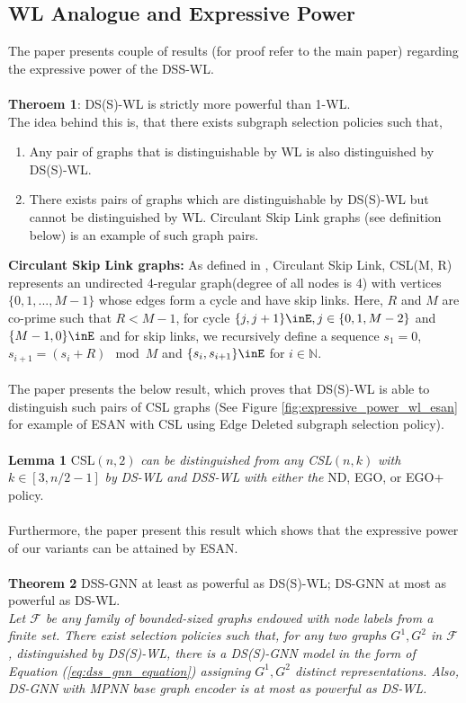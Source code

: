 \documentclass[11pt, dvipsnames, DIV=12]{scrreprt}
\theoremstyle{definition}
\begin{document}
\subsection{WL Analogue and Expressive Power}
The paper presents couple of results (for proof refer to the main paper) regarding the expressive power of the DSS-WL.\\\\
\textbf{Theroem 1}: DS(S)-WL is strictly more powerful than 1-WL. \\
The idea behind this is, that there exists subgraph selection policies such that,
\begin{enumerate}
    \item Any pair of graphs that is distinguishable by WL is also distinguished by DS(S)-WL.
    \item There exists pairs of graphs which are distinguishable by DS(S)-WL but cannot be distinguished by WL. Circulant Skip Link graphs (see definition below) is an example of such graph pairs.
\end{enumerate}\textbf{Circulant Skip Link graphs:} As defined in \cite{murphy_rel_pooling_2019}, Circulant Skip Link, CSL(M, R) represents an undirected 4-regular graph(degree of all nodes is 4) with vertices $\{0, 1, . . . , M − 1\}$ whose edges form a cycle and have skip links. Here, $R$ and $M$ are co-prime such that $R<M-1$, for cycle $\{j,j+1\}\inE, j\in\{0,1,M-2\}$ and $\{M-1,0\}\inE$ and for skip links, we recursively define a sequence $s_1=0$, $s_{i+1}=(s_i+R)\mod M$ and $\{s_i,s_{i+1}\}\inE$ for $i\in\mathbb{N}$.
\\\\The paper presents the below result, which proves that DS(S)-WL is able to distinguish such pairs of CSL graphs (See Figure \ref{fig:expressive_power_wl_esan} for example of ESAN with CSL using Edge Deleted subgraph selection policy).\\\\
\textbf{Lemma 1} CSL$(n, 2)$ \textit{can be distinguished from any CSL}$(n, k)$ \textit{with} $k\in[3,n/2-1]$ \textit{by} \textit{DS-WL} \textit{and} \textit{DSS-WL} \textit{with either the} ND, EGO, or EGO+ policy.\\\\
Furthermore, the paper present this result which shows that the expressive power of our variants can be attained by ESAN.\\\\
\textbf{Theorem 2} DSS-GNN at least as powerful as DS(S)-WL; DS-GNN at most as powerful as DS-WL.\\ \textit{Let $\mathcal{F}$ be any family of bounded-sized graphs endowed with node labels from a finite set. There exist selection policies such that, for any two graphs $G^1,G^2$ in $\mathcal{F}$, distinguished by DS(S)-WL, there is a DS(S)-GNN model in the form of Equation (\ref{eq:dss_gnn_equation}) assigning $G^1,G^2$ distinct representations. Also, DS-GNN with MPNN base graph encoder is at most as powerful as DS-WL.}\\\\
\end{document}
